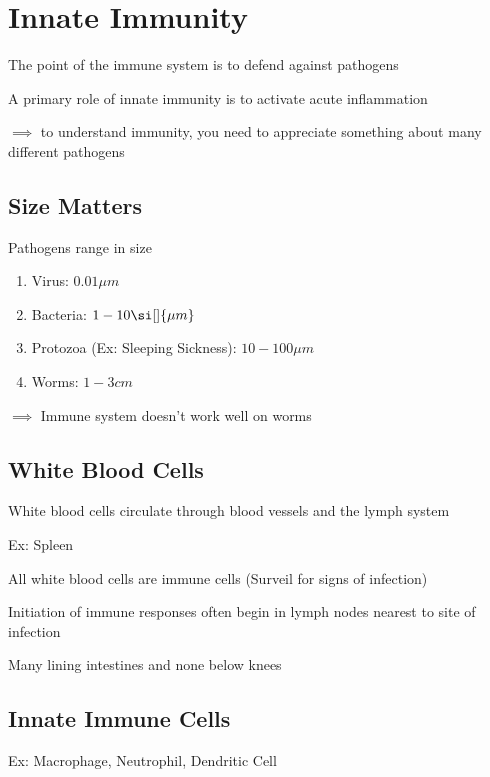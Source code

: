 \documentclass{notes}
\begin{document}
\section{Innate Immunity}
The point of the immune system is to defend against pathogens

\hspace*{10px}A primary role of innate immunity is to activate acute inflammation

\hspace*{10px} \(\implies\) to understand immunity, you need to appreciate something about many different pathogens


\subsection{Size Matters}
Pathogens range in size
\begin{enumerate}
    \item Virus: \(0.01 \si{\mu m}\)
    \item Bacteria: \(1-10 \si[]{\mu m}\)
    \item Protozoa (Ex: Sleeping Sickness): \(10-100 \si{\mu m}\)
    \item Worms: \(1-3 \si{cm}\)
\end{enumerate}
\hspace*{10px} \(\implies\) Immune system doesn't work well on worms

\subsection{White Blood Cells}

White blood cells circulate through blood vessels and the lymph system

\hspace*{10px} Ex: Spleen

All white blood cells are immune cells (Surveil for signs of infection)

Initiation of immune responses often begin in lymph nodes nearest to site of infection

\hspace*{10px} Many lining intestines and none below knees


\subsection{Innate Immune Cells}

Ex: Macrophage, Neutrophil, Dendritic Cell
\end{document}
